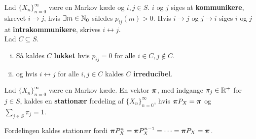 \begin{defn}
Lad $\{X_n\}_{n = 0}^\infty$ være en Markov kæde og $i, j \in S$. $i$ og $j$ siges at \textbf{kommunikere}, skrevet $i \to j$, hvis $\exists m \in \mathbb{N}_0$ således $p_{ij}(m) > 0$. Hvis $i \to j$ og $j \to i$ siges $i$ og $j$ at \textbf{intrakommunikere}, skrives $i \leftrightarrow j$.\\ Lad $C \subseteq S$.
\begin{enumerate}[i)]
    \item Så kaldes $C$ \textbf{lukket} hvis $p_{ij} = 0$ for alle $i \in C, j \not \in C$. 
    \item og hvis  $i \leftrightarrow j$ for alle $i, j \in C$ kaldes $C$ \textbf{irreducibel}.
\end{enumerate}
\end{defn}

\begin{defn}
Lad $\{X_n\}_{n = 0}^\infty$ være en Markov kæde. En vektor $\boldsymbol{\pi}$, med indgange $\pi_j \in \mathbb{R}^+$ for $j \in S$, kaldes en \textbf{stationær} fordeling af $\{X_n\}_{n = 0}^\infty$, hvis $\boldsymbol{\pi}P_X = \boldsymbol{\pi}$ og $\displaystyle \sum_{j \in S} \pi_j = 1$.
\end{defn}
Fordelingen kaldes stationær fordi $\boldsymbol{\pi} P_X^n = \boldsymbol{\pi} P_X^{n - 1} = \cdots = \boldsymbol{\pi} P_X = \boldsymbol{\pi}$.
